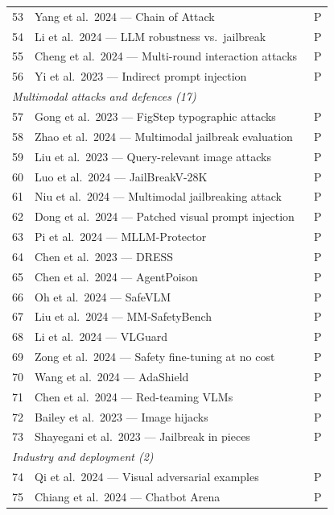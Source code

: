 \begin{longtable}{rp{12.0cm}c}
    53 & Yang et al.\ 2024 — Chain of Attack~\cite{yang2024chain} & P \\
    54 & Li et al.\ 2024 — LLM robustness vs.\ jailbreak~\cite{li2024llm} & P \\
    55 & Cheng et al.\ 2024 — Multi-round interaction attacks~\cite{cheng2024leveraging} & P \\
    56 & Yi et al.\ 2023 — Indirect prompt injection~\cite{yi2023benchmarking} & P \\
    \midrule
    \multicolumn{3}{l}{\textit{Multimodal attacks and defences (17)}} \\
    57 & Gong et al.\ 2023 — FigStep typographic attacks~\cite{gong2023figstep} & P \\
    58 & Zhao et al.\ 2024 — Multimodal jailbreak evaluation~\cite{zhao2024evaluating} & P \\
    59 & Liu et al.\ 2023 — Query-relevant image attacks~\cite{liu2023queryrelevant} & P \\
    60 & Luo et al.\ 2024 — JailBreakV-28K~\cite{luo2024jailbreakv} & P \\
    61 & Niu et al.\ 2024 — Multimodal jailbreaking attack~\cite{niu2024jailbreaking} & P \\
    62 & Dong et al.\ 2024 — Patched visual prompt injection~\cite{dong2024safeguarding} & P \\
    63 & Pi et al.\ 2024 — MLLM-Protector~\cite{pi2024mllm} & P \\
    64 & Chen et al.\ 2023 — DRESS~\cite{chen2024dresssafety} & P \\
    65 & Chen et al.\ 2024 — AgentPoison~\cite{chen2024agentpoison} & P \\
    66 & Oh et al.\ 2024 — SafeVLM~\cite{oh2024safevlm} & P \\
    67 & Liu et al.\ 2024 — MM-SafetyBench~\cite{liu2024mmsafetybench} & P \\
    68 & Li et al.\ 2024 — VLGuard~\cite{li2024vlguard} & P \\
    69 & Zong et al.\ 2024 — Safety fine-tuning at no cost~\cite{zong2024safety} & P \\
    70 & Wang et al.\ 2024 — AdaShield~\cite{wang2024adashield} & P \\
    71 & Chen et al.\ 2024 — Red-teaming VLMs~\cite{chen2024red} & P \\
    72 & Bailey et al.\ 2023 — Image hijacks~\cite{bailey2023image} & P \\
    73 & Shayegani et al.\ 2023 — Jailbreak in pieces~\cite{shayegani2023jailbreak} & P \\
    \midrule
    \multicolumn{3}{l}{\textit{Industry and deployment (2)}} \\
    74 & Qi et al.\ 2024 — Visual adversarial examples~\cite{qi2024visual} & P \\
    75 & Chiang et al.\ 2024 — Chatbot Arena~\cite{chiang2024chatbot} & P \\
\end{longtable}
\normalsize

